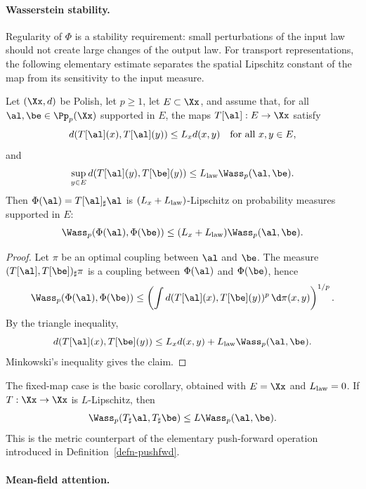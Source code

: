 \paragraph{Wasserstein stability.}

Regularity of $\Phi$ is a stability requirement: small perturbations of the input law should not create large changes of the output law. For transport representations, the following elementary estimate separates the spatial Lipschitz constant of the map from its sensitivity to the input measure.

\begin{prop}\label{prop-measure-map-wass-lipschitz}
		Let $(\Xx,d)$ be Polish, let $p\geq1$, let $E\subset\Xx$, and assume that, for all $\al,\be\in\Pp_p(\Xx)$ supported in $E$, the maps $T[\al]:E\to\Xx$ satisfy
	\[
		d(T[\al](x),T[\al](y)) \leq L_x d(x,y)
		\quad\text{for all }x,y\in E,
	\]
	and
	\[
		\sup_{y\in E} d(T[\al](y),T[\be](y))
		\leq L_{\rm law} \Wass_p(\al,\be).
		\]
		Then $\Phi(\al)=T[\al]_\sharp\al$ is $(L_x+L_{\rm law})$-Lipschitz on probability measures supported in $E$:
	\[
		\Wass_p(\Phi(\al),\Phi(\be))
		\leq
			(L_x+L_{\rm law})\Wass_p(\al,\be).
	\]
\end{prop}
\begin{proof}
	Let $\pi$ be an optimal coupling between $\al$ and $\be$. The measure $(T[\al],T[\be])_\sharp\pi$ is a coupling between $\Phi(\al)$ and $\Phi(\be)$, hence
	\[
		\Wass_p(\Phi(\al),\Phi(\be))
		\leq
		\left(
		\int d(T[\al](x),T[\be](y))^p\,\d\pi(x,y)
		\right)^{1/p}.
	\]
	By the triangle inequality,
	\[
		d(T[\al](x),T[\be](y))
		\leq
			L_x d(x,y)+L_{\rm law}\Wass_p(\al,\be).
	\]
	Minkowski's inequality gives the claim.
\end{proof}

The fixed-map case is the basic corollary, obtained with $E=\Xx$ and $L_{\rm law}=0$. If $T:\Xx\to\Xx$ is $L$-Lipschitz, then
\[
	\Wass_p(T_\sharp\al,T_\sharp\be)\leq L\Wass_p(\al,\be).
\]
This is the metric counterpart of the elementary push-forward operation introduced in Definition~\ref{defn-pushfwd}.

\paragraph{Mean-field attention.}\label{par-mean-field-attention}

